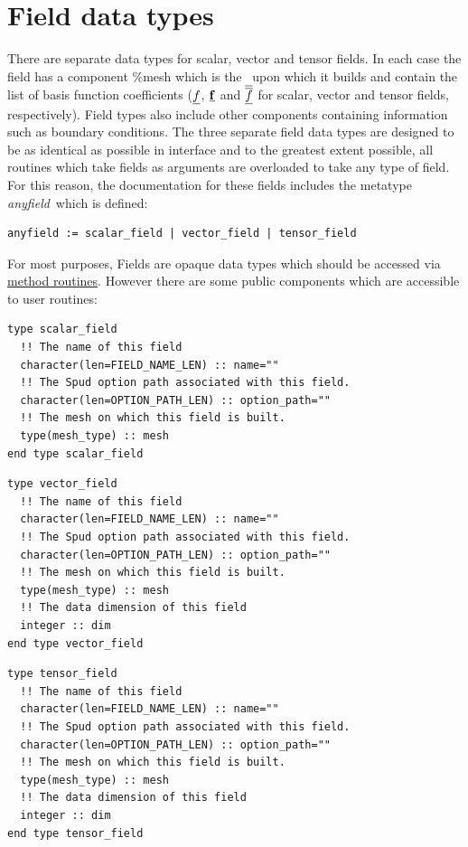 \documentclass[a4paper, 11pt]{book}
\begin{document}
\section{Field data types}\hypertarget{type:anyfield}{}

There are separate data types for scalar, vector and tensor fields. In each
case the field has a component \%mesh which is the \meshtype\ upon which it
builds and contain the list of basis function coefficients ($\underline{f}$,
$\underline{\mathbf{f}}$ and $\underline{\overline{\overline{f}}}$ for scalar, vector and tensor
fields, respectively). Field types also include other components containing
information such as boundary conditions. The three separate field data types
are designed to be as identical as possible in interface and to the greatest
extent possible, all routines which take fields as arguments are overloaded
to take any type of field. For this reason, the documentation for these
fields includes the metatype \textit{anyfield}\ which is defined:
\begin{lstlisting}[language=bnf]
  anyfield := scalar_field | vector_field | tensor_field
\end{lstlisting}
For most purposes, Fields are opaque data types which should be accessed via
\hyperlink{chap:fieldmeshmethods}{method routines}. However there are some
public components which are accessible to user routines:
\hypertarget{type:scalarfield}{}
\begin{lstlisting}
type scalar_field 
  !! The name of this field
  character(len=FIELD_NAME_LEN) :: name=""
  !! The Spud option path associated with this field.
  character(len=OPTION_PATH_LEN) :: option_path=""
  !! The mesh on which this field is built.
  type(mesh_type) :: mesh
end type scalar_field
\end{lstlisting}

\hypertarget{type:vectorfield}{}
\begin{lstlisting}
type vector_field 
  !! The name of this field
  character(len=FIELD_NAME_LEN) :: name=""
  !! The Spud option path associated with this field.
  character(len=OPTION_PATH_LEN) :: option_path=""
  !! The mesh on which this field is built.
  type(mesh_type) :: mesh
  !! The data dimension of this field
  integer :: dim
end type vector_field
\end{lstlisting}

\hypertarget{type:tensorfield}{}
\begin{lstlisting}
type tensor_field 
  !! The name of this field
  character(len=FIELD_NAME_LEN) :: name=""
  !! The Spud option path associated with this field.
  character(len=OPTION_PATH_LEN) :: option_path=""
  !! The mesh on which this field is built.
  type(mesh_type) :: mesh
  !! The data dimension of this field
  integer :: dim
end type tensor_field
\end{lstlisting}
\end{document}
